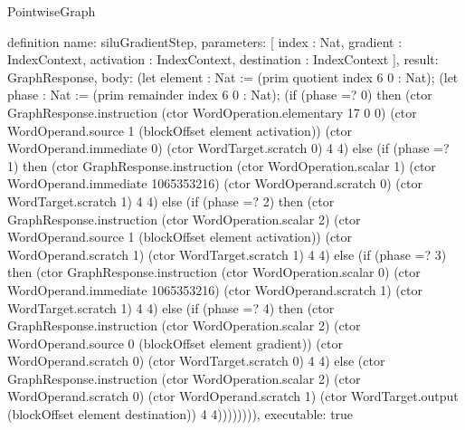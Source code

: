 \begin{lexlean}{PointwiseGraph}
\begin{semanticmodule}
definition{
  name: siluGradientStep,
  parameters: [
    index : Nat,
    gradient : IndexContext,
    activation : IndexContext,
    destination : IndexContext
  ],
  result: GraphResponse,
  body: (let element : Nat := (prim quotient index 6 0 : Nat); (let phase : Nat := (prim remainder index 6 0 : Nat); (if (phase =? 0) then (ctor GraphResponse.instruction (ctor WordOperation.elementary 17 0 0) (ctor WordOperand.source 1 (blockOffset element activation)) (ctor WordOperand.immediate 0) (ctor WordTarget.scratch 0) 4 4) else (if (phase =? 1) then (ctor GraphResponse.instruction (ctor WordOperation.scalar 1) (ctor WordOperand.immediate 1065353216) (ctor WordOperand.scratch 0) (ctor WordTarget.scratch 1) 4 4) else (if (phase =? 2) then (ctor GraphResponse.instruction (ctor WordOperation.scalar 2) (ctor WordOperand.source 1 (blockOffset element activation)) (ctor WordOperand.scratch 1) (ctor WordTarget.scratch 1) 4 4) else (if (phase =? 3) then (ctor GraphResponse.instruction (ctor WordOperation.scalar 0) (ctor WordOperand.immediate 1065353216) (ctor WordOperand.scratch 1) (ctor WordTarget.scratch 1) 4 4) else (if (phase =? 4) then (ctor GraphResponse.instruction (ctor WordOperation.scalar 2) (ctor WordOperand.source 0 (blockOffset element gradient)) (ctor WordOperand.scratch 0) (ctor WordTarget.scratch 0) 4 4) else (ctor GraphResponse.instruction (ctor WordOperation.scalar 2) (ctor WordOperand.scratch 0) (ctor WordOperand.scratch 1) (ctor WordTarget.output (blockOffset element destination)) 4 4)))))))),
  executable: true
}


\end{semanticmodule}
\end{lexlean}

